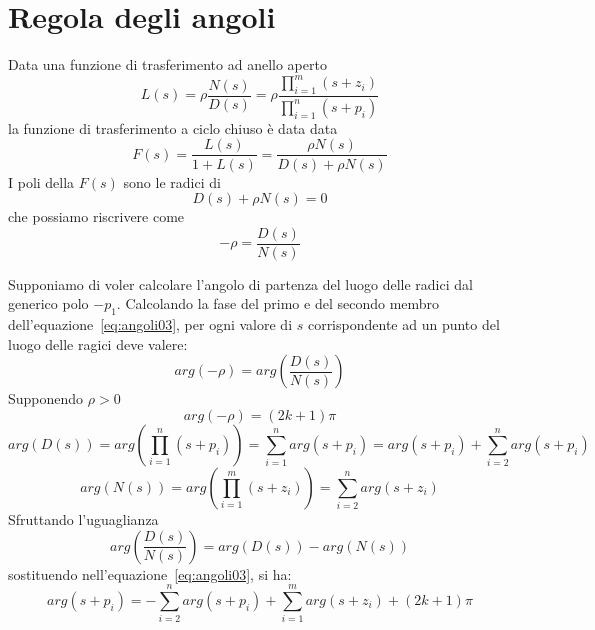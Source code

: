 \documentclass[a4paper]{report}
\begin{document}
\section{Regola degli angoli}
Data una funzione di trasferimento ad anello aperto 
\begin{equation}\label{eq:angoli01}
L(s) = \rho \dfrac{N(s)}{D(s)} = \rho \dfrac{\prod\limits_{i =
    1}^{m} (s + z_i)}{\prod\limits_{i = 1}^{n} (s + p_i)}
\end{equation}
la funzione di trasferimento a ciclo chiuso \`e data data
\begin{equation}\label{eq:angoli02}
F(s) = \dfrac{L(s)}{1 + L(s)} =  \dfrac{\rho N(s)}{D(s) + \rho N(s)}
\end{equation}
I poli della $F(s)$ sono le radici di
\[
D(s) + \rho N(s) = 0
\]
che possiamo riscrivere come
\begin{equation}\label{eq:angoli03}
- \rho = \dfrac{D(s)}{N(s)}
\end{equation}

Supponiamo di voler calcolare l'angolo di partenza del luogo delle
radici dal generico polo $-p_1$. Calcolando la fase del primo e del
secondo membro dell'equazione~\ref{eq:angoli03}, per ogni valore di
$s$ corrispondente ad un punto del luogo delle ragici deve valere:
\begin{equation}\label{eq:angoli04}
arg(- \rho) = arg \left(\dfrac{D(s)}{N(s)} \right)
\end{equation}
Supponendo $\rho > 0$
\[
arg(- \rho) = (2k + 1)\pi
\]
\[
arg(D(s)) = arg\left( \prod\limits_{i = 1}^{n}(s + p_i) \right) =
\sum\limits_{i = 1}^{n} arg(s + p_i) = arg(s + p_i) + \sum\limits_{i =
2}^{n} arg(s + p_i)
\]
\[
arg(N(s)) = arg\left( \prod\limits_{i = 1}^{m}(s + z_i) \right) = \sum\limits_{i =
2}^{n} arg(s + z_i)
\]
Sfruttando l'uguaglianza
\[
arg \left( \dfrac{D(s)}{N(s)}\right) = arg(D(s)) - arg(N(s))
\]
sostituendo nell'equazione~\ref{eq:angoli03}, si ha:
\begin{equation}\label{eq:angoli05}
  arg(s + p_i) = - \sum\limits_{i = 2}^{n} arg(s + p_i) +
  \sum\limits_{i = 1}^{m} arg(s + z_i) + (2k + 1)\pi
\end{equation}
\end{document}
